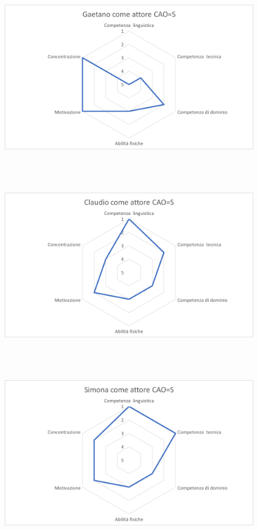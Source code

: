 \documentclass[../Report.tex]{subfiles}
\begin{document}
    \begin{figure}[H]
        \includegraphics[height=8cm]{GaetanoCAOS.png}
        \centering
    \end{figure}
    \begin{figure}[H]
        \includegraphics[height=8cm]{ClaudioCAOS.png}
        \centering
    \end{figure}
    \begin{figure}[H]
        \includegraphics[height=8cm]{SimonaCAOS.png}
        \centering
    \end{figure}
\end{document}
